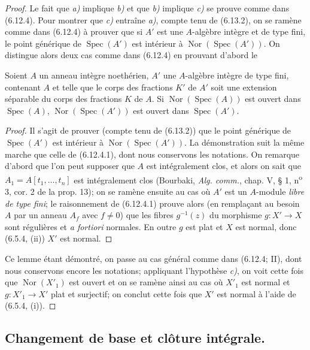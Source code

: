 \begin{proof}
Le fait que \emph{a)} implique \emph{b)} et que \emph{b)} implique \emph{c)} se prouve comme dans
(6.12.4). Pour montrer que \emph{c)} entraîne \emph{a)}, compte tenu de (6.13.2), on se
ramène comme dans (6.12.4) à prouver que si $A'$ est une $A$-algèbre intègre
et de type fini, le point générique de $\operatorname{Spec}(A')$ est
intérieur à $\operatorname{Nor}(\operatorname{Spec}(A'))$. On distingue
alors deux cas comme dans (6.12.4) en prouvant d'abord le

\begin{lemma}[6.13.7.1]
\label{IV.2.s6.13.7.1-fr}
Soient $A$ un anneau intègre noethérien, $A'$ une $A$-algèbre intègre de
type fini, contenant $A$ et telle que le corps des fractions $K'$ de $A'$
soit une extension séparable du corps des fractions $K$ de $A$. Si
$\operatorname{Nor}(\operatorname{Spec}(A))$ est ouvert dans
$\operatorname{Spec}(A)$, $\operatorname{Nor}(\operatorname{Spec}(A'))$ est
ouvert dans $\operatorname{Spec}(A')$.
\end{lemma}

\begin{proof}
Il s'agit de prouver (compte tenu de (6.13.2)) que le point générique de
$\operatorname{Spec}(A')$ est intérieur à
$\operatorname{Nor}(\operatorname{Spec}(A'))$. La démonstration suit la
même marche que celle de (6.12.4.1), dont nous conservons les notations. On
remarque d'abord que l'on peut supposer que $A$ est intégralement clos, et
alors on sait que $A_1=A[t_1,\ldots,t_n]$ est intégralement clos (Bourbaki,
\emph{Alg. comm.}, chap. V, § 1, n\textsuperscript{o} 3, cor. 2 de la prop. 13); on se ramène
ensuite au cas où $A'$ est un $A$-module \emph{libre de type fini}; le raisonnement
de (6.12.4.1) prouve alors (en remplaçant au besoin $A$ par un anneau $A_f$
avec $f\neq0$) que les fibres $g^{-1}(z)$ du morphisme $g:X'\to X$ sont
régulières et \emph{a fortiori} normales. En outre $g$ est plat et $X$ est normal,
donc (6.5.4, (ii)) $X'$ est normal.
\end{proof}

Ce lemme étant démontré, on passe au cas général comme dans (6.12.4; II),
dont nous conservons encore les notations; appliquant l'hypothèse \emph{c)}, on
voit cette fois que $\operatorname{Nor}(X'_1)$ est ouvert et on se ramène
ainsi au cas où $X'_1$ est normal et $g:X'_1\to X'$ plat et surjectif; on
conclut cette fois que $X'$ est normal à l'aide de (6.5.4, (i)).
\end{proof}

\subsection{Changement de base et clôture intégrale.}
\label{IV.2.s6.14-fr}

